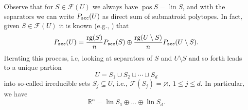 \documentclass[11pt, a4paper, twoside, reqno]{amsart}
\DeclareMathOperator*{\pos}{pos}
\DeclareMathOperator*{\lin}{lin}
\DeclareMathOperator*{\rg}{rg}
\newcommand{\R}{\mathbb{R}}
\theoremstyle{definition}
\theoremstyle{remark}
\newcommand{\scc}{{\tt scc}}
\let\emptyset\varnothing
\numberwithin{equation}{section}
\begin{document}
Observe that for $S\in\mathcal{F}(U)$ we always have $\pos S=\lin S$, and with the separators we can write
$P_\scc(U)$ as direct sum of submatroid polytopes.
 In fact, given $S\in\mathcal{F}(U)$ it is
known (e.g., \cite[pp. 315]{Aigner1997}) that
\begin{equation}
                 P_\scc(U)=\frac{\rg(S)}{n}P_\scc(S)\oplus
                 \frac{\rg(U\setminus S)}{n}P_\scc(U\setminus S).
\label{eq:sepsplit}
\end{equation}
Iterating this process, i.e, looking at separators of $S$ and
$U\setminus S$ and so forth leads to a unique partion
\begin{equation}
  U=S_1\cup S_2 \cup \cdots \cup S_d
\label{eq:uniquepart}
\end{equation}
into so-called irreducible sets $S_j\subseteq U$, i.e.,
$\mathcal{F}(S_j)=\emptyset$, $1\leq j\leq d$.  In particular, we have
\begin{equation*}
    \R^n =\lin S_1\oplus \dots \oplus \lin S_d.
\end{equation*}
\end{document}
